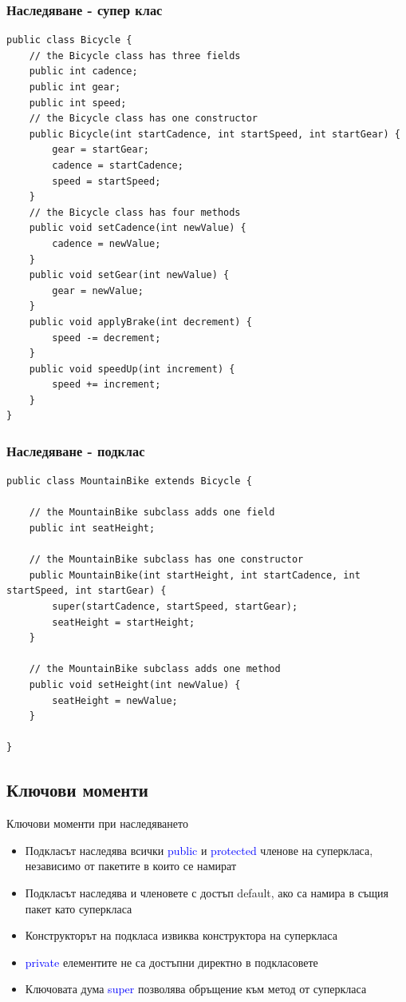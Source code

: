\documentclass{beamer}
\begin{document}
\begin{frame}[fragile]
  \frametitle{Наследяване - супер клас}
  \transdissolve
\begin{lstlisting}
public class Bicycle {
    // the Bicycle class has three fields
    public int cadence;
    public int gear;
    public int speed;
    // the Bicycle class has one constructor
    public Bicycle(int startCadence, int startSpeed, int startGear) {
        gear = startGear;
        cadence = startCadence;
        speed = startSpeed;
    }
    // the Bicycle class has four methods
    public void setCadence(int newValue) {
        cadence = newValue;
    }
    public void setGear(int newValue) {
        gear = newValue;
    }
    public void applyBrake(int decrement) {
        speed -= decrement;
    }
    public void speedUp(int increment) {
        speed += increment;
    }
}
\end{lstlisting}
\end{frame}

\begin{frame}[fragile]
  \frametitle{Наследяване - подклас}
  \transdissolve
\begin{lstlisting}
public class MountainBike extends Bicycle {
	
    // the MountainBike subclass adds one field
    public int seatHeight;

    // the MountainBike subclass has one constructor
    public MountainBike(int startHeight, int startCadence, int startSpeed, int startGear) {
        super(startCadence, startSpeed, startGear);
        seatHeight = startHeight;
    }	
	
    // the MountainBike subclass adds one method
    public void setHeight(int newValue) {
        seatHeight = newValue;
    }	

}
\end{lstlisting}
\end{frame}

\subsection{Ключови моменти}
\begin{frame}{Ключови моменти при наследяването}
  \transdissolve
  \begin{itemize}
  \item Подкласът наследява всички \textcolor{blue}{public} и
    \textcolor{blue}{protected} членове на суперкласа, независимо от
    пакетите в които се намират \pause
  \item Подкласът наследява и членовете с достъп default, ако са
    намира в същия пакет като суперкласа \pause
  \item Конструкторът на подкласа извиква конструктора на суперкласа \pause
  \item \textcolor{blue}{private} елементите не са достъпни директно в
    подкласовете \pause
  \item Ключовата дума \textcolor{blue}{super} позволява обръщение към метод от
    суперкласа
  \end{itemize}
\end{frame}
\end{document}
